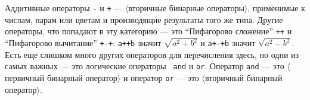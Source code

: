 \documentclass{article} %
\newcommand\invisgap{\nobreak\hskip0pt\relax}
\newcommand\tdescr[1]{$\langle$\invisgap#1\invisgap$\rangle$}
\begin{document}
Аддитивные операторы {\tt -} и {\tt +}\label{Dadd} --- 
\tdescr{вторичные бинарные операторы}, применимые к числам, парам или 
цветам и производящие результаты того же типа.
Другие операторы, что попадают в эту категорию --- это ``Пифагорово 
сложение'' \verb|++|\label{Dpyadd} и ``Пифагорово 
вычитание'' \verb|+-+|\label{Dpysub}:
\verb|a++b| значит $\sqrt{a^2+b^2}$ и \verb|a+-+b| значит
$\sqrt{a^2-b^2}$. 
Есть еще слишком много других операторов для перечисления здесь, но 
одни из самых важных --- это логические операторы {\tt
and} и {\tt or}.
Оператор {\tt and} --- это \tdescr{первичный бинарный оператор} и оператор 
{\tt or} --- это \tdescr{вторичный бинарный оператор}.
\end{document}
